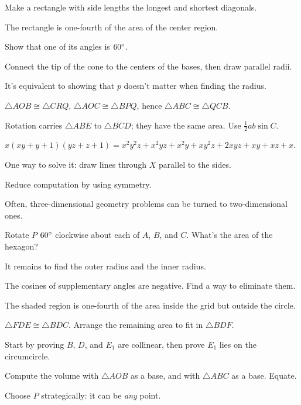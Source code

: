 \documentclass[11pt,paper=letter]{scrartcl}
\begin{document}
\begin{enumthin}[leftmargin=0pt]
\item \label{h:gb92} Make a rectangle with side lengths the longest and shortest diagonals.
\item \label{h:os43} The rectangle is one-fourth of the area of the center region.
\item \label{h:vs01} Show that one of its angles is $60^\circ$.
\item \label{h:pc44} Connect the tip of the cone to the centers of the bases, then draw parallel radii.
\item \label{h:dt43} It's equivalent to showing that $p$ doesn't matter when finding the radius.
\item \label{h:gbf5} $\triangle AOB \cong \triangle CRQ$, $\triangle AOC \cong \triangle BPQ$, hence $\triangle ABC \cong \triangle QCB$.
\item \label{h:pt54} Rotation carries $\triangle ABE$ to $\triangle BCD$; they have the same area. Use $\frac12 ab \sin C$.
\item \label{h:rt06} $x(xy+y+1)(yz+z+1) = x^2y^2z + x^2yz + x^2y + xy^2z + 2xyz + xy + xz + x$.
\item \label{h:vt41} One way to solve it: draw lines through $X$ parallel to the sides.
\item \label{h:rt41} Reduce computation by using symmetry.
\item \label{h:gbc1} Often, three-dimensional geometry problems can be turned to two-dimensional ones.
\item \label{h:pt32} Rotate $P$ $60^\circ$ clockwise about each of $A$, $B$, and $C$. What's the area of the hexagon?
\item \label{h:np01} It remains to find the outer radius and the inner radius.
\item \label{h:pl41} The cosines of supplementary angles are negative. Find a way to eliminate them.
\item \label{h:os22} The shaded region is one-fourth of the area inside the grid but outside the circle.
\item \label{h:gba4} $\triangle FDE \cong \triangle BDC$. Arrange the remaining area to fit in $\triangle BDF$.
\item \label{h:vs03} Start by proving $B$, $D$, and $E_1$ are collinear, then prove $E_1$ lies on the circumcircle.
\item \label{h:dg42} Compute the volume with $\triangle AOB$ as a base, and with $\triangle ABC$ as a base. Equate.
\item \label{h:vt21} Choose $P$ strategically: it can be \emph{any} point.

\end{enumthin}
\end{document}
